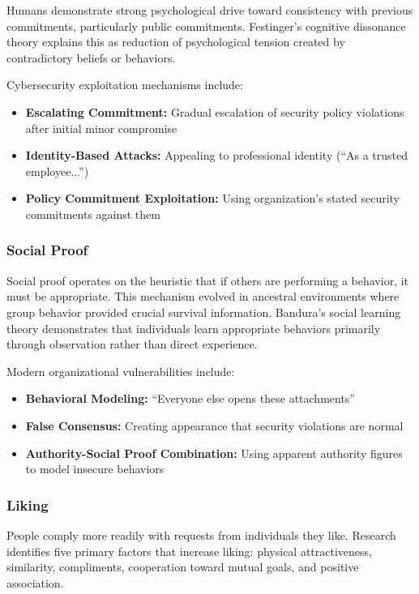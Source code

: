 \documentclass[11pt,a4paper]{article}
\begin{document}
Humans demonstrate strong psychological drive toward consistency with previous commitments, particularly public commitments. Festinger's cognitive dissonance theory\cite{festinger1957} explains this as reduction of psychological tension created by contradictory beliefs or behaviors.

Cybersecurity exploitation mechanisms include:

\begin{itemize}
\item \textbf{Escalating Commitment:} Gradual escalation of security policy violations after initial minor compromise
\item \textbf{Identity-Based Attacks:} Appealing to professional identity (``As a trusted employee...'')
\item \textbf{Policy Commitment Exploitation:} Using organization's stated security commitments against them
\end{itemize}

\subsubsection{Social Proof}

Social proof operates on the heuristic that if others are performing a behavior, it must be appropriate. This mechanism evolved in ancestral environments where group behavior provided crucial survival information. Bandura's social learning theory\cite{bandura1977} demonstrates that individuals learn appropriate behaviors primarily through observation rather than direct experience.

Modern organizational vulnerabilities include:

\begin{itemize}
\item \textbf{Behavioral Modeling:} ``Everyone else opens these attachments''
\item \textbf{False Consensus:} Creating appearance that security violations are normal
\item \textbf{Authority-Social Proof Combination:} Using apparent authority figures to model insecure behaviors
\end{itemize}

\subsubsection{Liking}

People comply more readily with requests from individuals they like. Research identifies five primary factors that increase liking: physical attractiveness, similarity, compliments, cooperation toward mutual goals, and positive association\cite{cialdini2007}.
\end{document}
